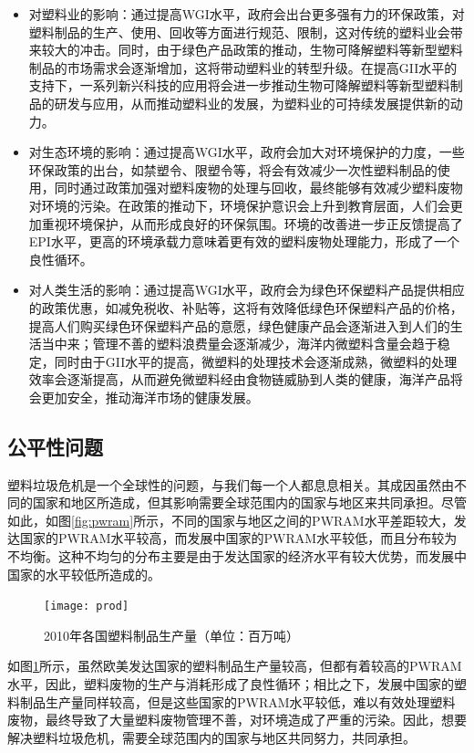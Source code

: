 \documentclass[UTF8, fontset=windows]{mcmthesis}
\begin{document}
\begin{itemize}
  \item 对塑料业的影响：通过提高WGI水平，政府会出台更多强有力的环保政策，对塑料制品的生产、使用、回收等方面进行规范、限制，这对传统的塑料业会带来较大的冲击。同时，由于绿色产品政策的推动，生物可降解塑料等新型塑料制品的市场需求会逐渐增加，这将带动塑料业的转型升级。在提高GII水平的支持下，一系列新兴科技的应用将会进一步推动生物可降解塑料等新型塑料制品的研发与应用，从而推动塑料业的发展，为塑料业的可持续发展提供新的动力。
  \item 对生态环境的影响：通过提高WGI水平，政府会加大对环境保护的力度，一些环保政策的出台，如禁塑令、限塑令等，将会有效减少一次性塑料制品的使用，同时通过政策加强对塑料废物的处理与回收，最终能够有效减少塑料废物对环境的污染。在政策的推动下，环境保护意识会上升到教育层面，人们会更加重视环境保护，从而形成良好的环保氛围。环境的改善进一步正反馈提高了EPI水平，更高的环境承载力意味着更有效的塑料废物处理能力，形成了一个良性循环。
  \item 对人类生活的影响：通过提高WGI水平，政府会为绿色环保塑料产品提供相应的政策优惠，如减免税收、补贴等，这将有效降低绿色环保塑料产品的价格，提高人们购买绿色环保塑料产品的意愿，绿色健康产品会逐渐进入到人们的生活当中来；管理不善的塑料浪费量会逐渐减少，海洋内微塑料含量会趋于稳定，同时由于GII水平的提高，微塑料的处理技术会逐渐成熟，微塑料的处理效率会逐渐提高，从而避免微塑料经由食物链威胁到人类的健康，海洋产品将会更加安全，推动海洋市场的健康发展。
\end{itemize}

\subsection{公平性问题}

塑料垃圾危机是一个全球性的问题，与我们每一个人都息息相关。其成因虽然由不同的国家和地区所造成，但其影响需要全球范围内的国家与地区来共同承担。尽管如此，如图\ref{fig:pwram}所示，不同的国家与地区之间的PWRAM水平差距较大，发达国家的PWRAM水平较高，而发展中国家的PWRAM水平较低，而且分布较为不均衡。这种不均匀的分布主要是由于发达国家的经济水平有较大优势，而发展中国家的水平较低所造成的。

\begin{figure}[h]
  \centering
  \texttt{[image: prod]}
  \caption{2010年各国塑料制品生产量（单位：百万吨）}
  \label{fig:prod}
\end{figure}

如图\ref{fig:prod}所示\cite{owid-plastic-pollution}，虽然欧美发达国家的塑料制品生产量较高，但都有着较高的PWRAM水平，因此，塑料废物的生产与消耗形成了良性循环；相比之下，发展中国家的塑料制品生产量同样较高，但是这些国家的PWRAM水平较低，难以有效处理塑料废物，最终导致了大量塑料废物管理不善，对环境造成了严重的污染。因此，想要解决塑料垃圾危机，需要全球范围内的国家与地区共同努力，共同承担。
\end{document}
